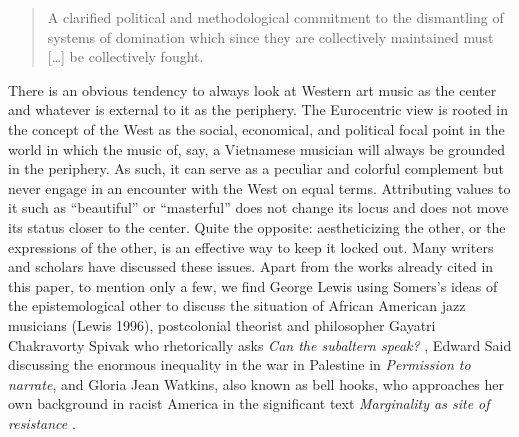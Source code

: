 \documentclass[a4paper]{article}
\begin{document}
\begin{quote}
  A clarified political and methodological commitment to the dismantling of
  systems of domination which since they are collectively maintained must [\ldots] be collectively
  fought. \autocite[p. 215]{said2000}
\end{quote}


There is an obvious tendency to always look at Western art music as the center and whatever is external to it as the periphery. The Eurocentric view is rooted in the concept of the West as the social, economical, and political focal point in the world in which the music of, say, a Vietnamese musician will always be grounded in the periphery. As such, it can serve as a peculiar and colorful complement but never engage in an encounter with the West on equal terms. Attributing values to it such as ``beautiful'' or ``masterful'' does not change its locus and does not move its status closer to the center. Quite the opposite: aestheticizing the other, or the expressions of the other, is an effective way to keep it locked out. Many writers and scholars have discussed these issues. Apart from the works already cited in this paper, to mention only a few, we find George Lewis using Somers’s ideas of the epistemological other to discuss the situation of African American jazz musicians (Lewis 1996), postcolonial theorist and philosopher Gayatri Chakravorty Spivak who rhetorically asks \emph{Can the subaltern speak?} , Edward Said discussing the enormous inequality in the war in Palestine in \emph{Permission to narrate}, and Gloria Jean Watkins, also known as bell hooks, who approaches her own background in racist America in the significant text \emph{Marginality as site of resistance} \autocite{HooksBell1990}. 
\end{document}
